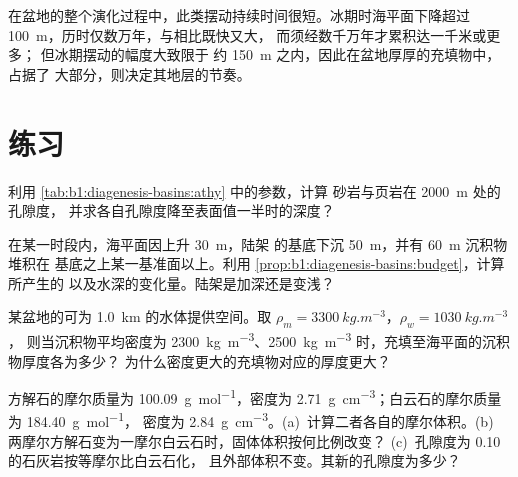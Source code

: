 在盆地的整个演化过程中，此类摆动持续时间很短。冰期时海平面下降超过
\qty{100}{m}，历时仅数万年，与相比既快又大，
而须经数千万年才累积达一千米或更多；
但冰期摆动的幅度大致限于
约 \qty{150}{m} 之内，因此在盆地厚厚的充填物中，占据了
大部分，则决定其地层的节奏。

\section{练习}

\begin{exercise}[$\star$]\label{exo:b1:diagenesis-basins:1}
利用 \cref{tab:b1:diagenesis-basins:athy} 中的参数，计算
砂岩与页岩在 \qty{2000}{m} 处的孔隙度，
并求各自孔隙度降至表面值一半时的深度？
\end{exercise}

\begin{exercise}[$\star$]\label{exo:b1:diagenesis-basins:2}
在某一时段内，海平面因上升 \qty{30}{m}，陆架
的基底下沉 \qty{50}{m}，并有 \qty{60}{m} 沉积物堆积在
基底之上某一基准面以上。利用
\cref{prop:b1:diagenesis-basins:budget}，计算所产生的
以及水深的变化量。陆架是加深还是变浅？
\end{exercise}

\begin{exercise}[$\star$]\label{exo:b1:diagenesis-basins:3}
某盆地的可为 \qty{1.0}{km} 的水体提供空间。取
$\rho_m = \qty{3300}{kg.m^{-3}}$，$\rho_w = \qty{1030}{kg.m^{-3}}$，
则当沉积物平均密度为
\qty{2300}{kg.m^{-3}}、\qty{2500}{kg.m^{-3}} 时，充填至海平面的沉积物厚度各为多少？
为什么密度更大的充填物对应的厚度更大？
\end{exercise}

\begin{exercise}[$\star$]\label{exo:b1:diagenesis-basins:4}
方解石的摩尔质量为 \qty{100.09}{g.mol^{-1}}，密度为
\qty{2.71}{g.cm^{-3}}；白云石的摩尔质量为 \qty{184.40}{g.mol^{-1}}，
密度为 \qty{2.84}{g.cm^{-3}}。(a)~计算二者各自的摩尔体积。(b)~
两摩尔方解石变为一摩尔白云石时，固体体积按何比例改变？
(c)~孔隙度为 \num{0.10} 的石灰岩按等摩尔比白云石化，
且外部体积不变。其新的孔隙度为多少？
\end{exercise}

